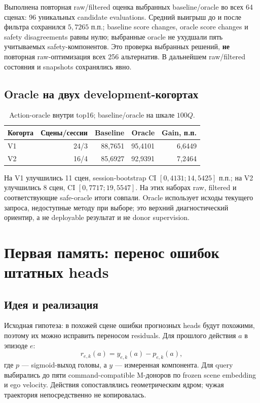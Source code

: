 \documentclass[11pt,a4paper]{article}
\begin{document}
Выполнена повторная raw/filtered оценка выбранных baseline/oracle во всех 64 сценах: 96 уникальных candidate evaluations. Средний выигрыш до и после фильтра сохранился $5{,}7265$ п.п.; baseline score changes, oracle score changes и safety disagreements равны нулю; выбранные oracle не ухудшали пять учитываемых safety-компонентов. Это проверка выбранных решений, \textbf{не} повторная raw-оптимизация всех 256 альтернатив. В дальнейшем raw/filtered состояния и snapshots сохранялись явно.

\subsection{Oracle на двух development-когортах}
\par
\begin{table}[htbp]\centering\small
\caption{Action-oracle внутри top16; baseline/oracle на шкале $100Q$.}
\begin{tabular}{@{}lrrrr@{}}\toprule
Когорта & Сцены/сессии & Baseline & Oracle & Gain, п.п.\\\midrule
V1 & 24/3 & 88,7651 & 95,4101 & 6,6449\\
V2 & 16/4 & 85,6927 & 92,9391 & 7,2464\\\bottomrule
\end{tabular}
\end{table}
\par
На V1 улучшились 11 сцен, session-bootstrap CI $[0{,}4131;14{,}5425]$ п.п.; на V2 улучшились 8 сцен, CI $[0{,}7717;19{,}5547]$. На этих наборах raw, filtered и соответствующие safe-oracle итоги совпали. Oracle использует исходы текущего запроса, недоступные методу при выборе; это верхний диагностический ориентир, а не deployable результат и не donor supervision.

\section{Первая память: перенос ошибок штатных heads}
\subsection{Идея и реализация}
Исходная гипотеза: в похожей сцене ошибки прогнозных heads будут похожими, поэтому их можно исправить переносом residuals. Для прошлого действия $a$ в эпизоде $e$:
\begin{equation}
 r_{e,k}(a)=y_{e,k}(a)-p_{e,k}(a),
\end{equation}
где $p$ --- sigmoid-выход головы, а $y$ --- измеренная компонента. Для query выбирались до пяти command-compatible M-доноров по frozen scene embedding и ego velocity. Действия сопоставлялись геометрическим ядром; чужая траектория непосредственно не копировалась.
\end{document}
